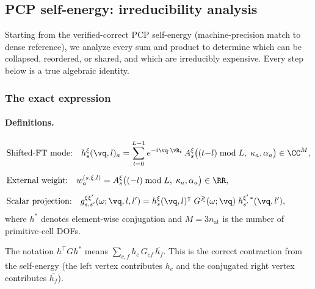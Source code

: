 \subsection{PCP self-energy: irreducibility analysis}
\label{sub:pcp_irreducibility}

Starting from the verified-correct PCP self-energy (machine-precision
match to dense reference), we analyze every sum and product to determine
which can be collapsed, reordered, or shared, and which are irreducibly
expensive.  Every step below is a true algebraic identity.


\subsubsection{The exact expression}

\paragraph{Definitions.}
\begin{align}
  &\text{Shifted-FT mode:}\quad
  h_s^{\xi}(\vq, l)_{a}
  = \sum_{t=0}^{L-1} e^{-i\vq\cdot\vR_t}\,
    A_s^{\xi}\bigl((t{-}l)\bmod L,\; \kappa_a, \alpha_a\bigr)
  \in \CC^M,
  \label{eq:h_def}\\[6pt]
  &\text{External weight:}\quad
  w_a^{(s,\xi,l)}
  = A_s^{\xi}\bigl((-l)\bmod L,\; \kappa_a, \alpha_a\bigr)
  \in \RR,
  \label{eq:w_def}\\[6pt]
  &\text{Scalar projection:}\quad
  g_{s,s'}^{\xi\xi'}(\omega;\vq,l,l')
  = h_s^{\xi}(\vq,l)^\intercal\;
    G^{\gtrless}(\omega;\vq)\;
    h_{s'}^{\xi'\,*}(\vq,l'),
  \label{eq:g_def}
\end{align}
where $h^*$ denotes element-wise conjugation and $M = 3n_\mathrm{at}$
is the number of primitive-cell DOFs.

The notation $h^\intercal G h^*$ means $\sum_{c,f} h_c \, G_{cf} \, \overline{h_f}$.
This is the correct contraction from the self-energy
(the left vertex contributes $h_c$ and the conjugated right vertex
contributes $\overline{h_f}$).

